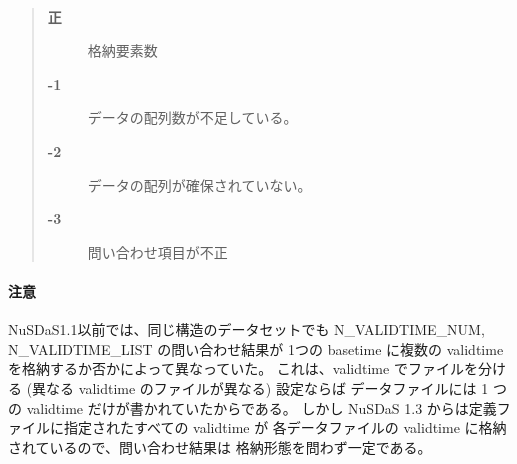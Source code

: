 \paragraph{\ResultCode}
\begin{quote}
\begin{description}
\item[{\bf 正}] 格納要素数
\item[{\bf -1}] データの配列数が不足している。
\item[{\bf -2}] データの配列が確保されていない。
\item[{\bf -3}] 問い合わせ項目が不正
\end{description}\end{quote}
\paragraph{ 注意 }
NuSDaS1.1以前では、同じ構造のデータセットでも
N\_VALIDTIME\_NUM, N\_VALIDTIME\_LIST の問い合わせ結果が
1つの basetime に複数の validtime を格納するか否かによって異なっていた。
これは、validtime でファイルを分ける
(異なる validtime のファイルが異なる) 設定ならば
データファイルには 1 つの validtime だけが書かれていたからである。
しかし NuSDaS 1.3 からは定義ファイルに指定されたすべての validtime が
各データファイルの validtime に格納されているので、問い合わせ結果は
格納形態を問わず一定である。
